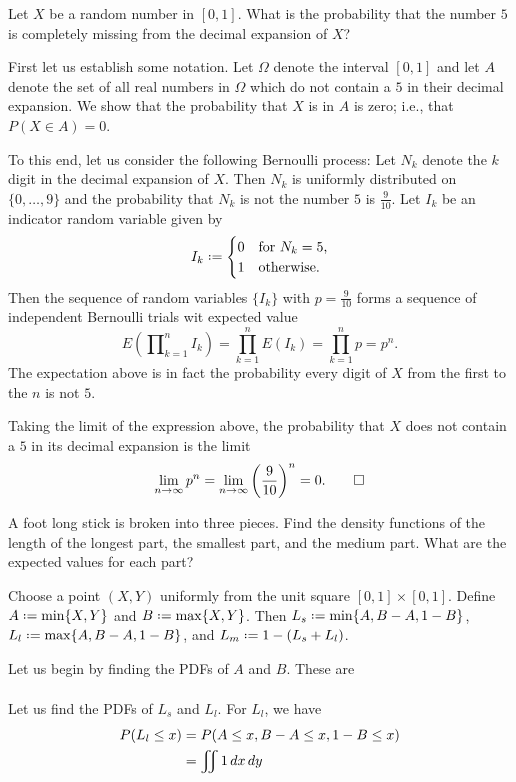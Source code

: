 \begin{problem}[Handout 18, \# 16]
  Let \(X\) be a random number in \([0,1]\). What is the probability that
  the number \(5\) is completely missing from the decimal expansion of
  \(X\)?
\end{problem}
\begin{solution}
  First let us establish some notation. Let \(\Omega\) denote the interval
  \([0,1]\) and let \(A\) denote the set of all real numbers in \(\Omega\)
  which do not contain a \(5\) in their decimal expansion. We show that the
  probability that \(X\) is in \(A\) is zero; i.e., that \(P(X\in A)=0\).

  To this end, let us consider the following Bernoulli process: Let \(N_k\)
  denote the \(k\) digit in the decimal expansion of
  \(X\). Then \(N_k\) is uniformly distributed on \(\{0,\dotsc,9\}\) and
  the probability that \(N_k\) is not the number \(5\) is
  \(\frac{9}{10}\). Let \(I_k\) be an indicator random variable given by
  \[
    I_k\defeq%
    \begin{cases}%
      0&\text{for \(N_k=5\),}\\
      1&\text{otherwise.}
    \end{cases}
  \]
  Then the sequence of random variables \(\{I_k\}\) with \(p=\frac{9}{10}\)
  forms a sequence of independent Bernoulli trials wit expected value
  \[
    E\left(\prod\nolimits_{k=1}^n I_k\right)=%
    \prod_{k=1}^n E(I_k)=%
    \prod_{k=1}^n p=p^n.
  \]
  The expectation above is in fact the probability every digit of \(X\)
  from the first to the \(n\) is not \(5\).

  Taking the limit of the expression above, the probability that \(X\) does
  not contain a \(5\) in its decimal expansion is the limit
  \[
    \lim_{n\to\infty}
    p^n=\lim_{n\to\infty}\left(\frac{9}{10}\right)^n=0.\qedhere
  \]
\end{solution}

\begin{problem}[Handout 18, \# 17]
  A foot long stick is broken into three pieces. Find the density functions
  of the length of the longest part, the smallest part, and the medium
  part. What are the expected values for each part?
\end{problem}
\begin{solution}
  Choose a point \((X,Y)\) uniformly from the unit square
  \([0,1]\times[0,1]\). Define \(A\defeq\min\{X,Y\}\) and
  \(B\defeq\max\{X,Y\}\). Then \(L_s\defeq\min\{A,B-A,1-B\}\),
  \(L_l\defeq\max\{A,B-A,1-B\}\), and \(L_m\defeq 1-(L_s+L_l)\).

  Let us begin by finding the PDFs of \(A\) and \(B\). These are
  \begin{align*}

  \end{align*}

  Let us find the PDFs of \(L_s\) and \(L_l\). For \(L_l\), we have
  \begin{align*}
    P(L_l\leq x)
    &=P(A\leq x,B-A\leq x,1-B\leq x)\\
    &=\iint 1\mathop{}\!d x\mathop{}\!d y
  \end{align*}
\end{solution}

